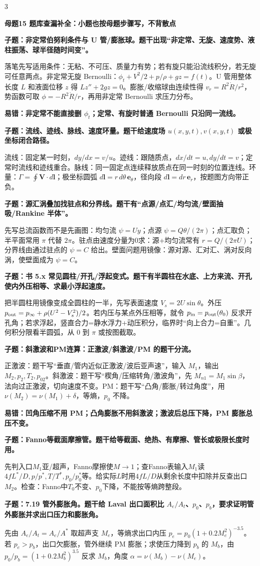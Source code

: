 \documentclass[a4paper]{article}
\newcommand{\mt}[1]{\vspace{0.22pt}\colorbox{M}{\parbox{\dimexpr\linewidth-2\fboxsep}{\color{white}\bfseries #1}}\par}
\newcommand{\qt}[1]{\vspace{0.10pt}\colorbox{Q}{\parbox{\dimexpr\linewidth-2\fboxsep}{\color{white}\bfseries #1}}\par}
\newcommand{\ans}[1]{\colorbox{G}{\parbox{\dimexpr\linewidth-2\fboxsep}{#1}}\par}
\newcommand{\warn}[1]{\colorbox{Y}{\parbox{\dimexpr\linewidth-2\fboxsep}{\color{E}\bfseries #1}}\par}
\begin{document}
\begin{multicols}{3}
\mt{母题15 题库查漏补全：小题也按母题步骤写，不背散点}
\qt{子题：非定常伯努利条件与 U 管/膨胀球。题干出现“非定常、无旋、速度势、液柱振荡、球半径随时间变”。}
\ans{落笔先写适用条件：无粘、不可压、质量力有势；若有旋只能沿流线积分，若无旋可任意两点。非定常无旋 Bernoulli：$\phi_t+V^2/2+p/\rho+gz=f(t)$。U 管用整体长度 $L$ 和液面位移 $z$ 得 $Lz''+2gz=0$。膨胀/收缩球由连续性得 $v_r=R^2\dot R/r^2$，势函数可取 $\phi=-R^2\dot R/r$，再用非定常 Bernoulli 求压力分布。}
\warn{易错：非定常不能直接删 $\phi_t$；定常、有旋时普通 Bernoulli 只沿同一流线。}
\qt{子题：流线、迹线、脉线、速度环量。题干给速度场 $u(x,y,t),v(x,y,t)$ 或极坐标闭合路径。}
\ans{流线：固定某一时刻，$dy/dx=v/u$。迹线：跟随质点，$dx/dt=u,dy/dt=v$；定常时流线和迹线重合。脉线：同一固定点连续释放质点在同一时刻的位置连线。环量：$\Gamma=\oint\bm V\cdot d\bm l$；极坐标圆弧 $d\bm l=r\,d\theta\,\bm e_\theta$，径向段 $d\bm l=dr\,\bm e_r$，按题图方向带正负。}
\qt{子题：源汇涡叠加找驻点和分界线。题干有“点源/点汇/均匀流/壁面抽吸/Rankine 半体”。}
\ans{先写总流函数而不是先画图：均匀流 $\psi=Uy$；点源 $\psi=Q\theta/(2\pi)$；点汇取负；半平面常用 $\pi$ 代替 $2\pi$。驻点由速度分量为0求：源+均匀流常有 $r=Q/(2\pi U)$；分界线由通过驻点的 $\psi=C$ 给出。壁面问题用镜像：源对源、汇对汇、涡对反向涡，使壁面成为 $\psi=C$。}
\qt{子题：书 5.x 常见圆柱/开孔/浮起变式。题干有半圆柱在水底、上方来流、开孔使内外压相等、求最小浮起速度。}
\ans{把半圆柱用镜像变成全圆柱的一半，先写表面速度 $V_s=2U\sin\theta$。外压 $p_{\rm out}=p_\infty+\rho(U^2-V_s^2)/2$。若内压与某点外压相等，就令 $p_{\rm in}=p_{\rm out}(\theta_0)$ 反求开孔角；若求浮起，竖直合力=静水浮力+动压积分，临界时“向上合力=自重”。几何积分限看半圆弧，从 $0$ 到 $\pi$ 或按图截取。}
\qt{子题：斜激波和PM连算：正激波/斜激波/PM 的题干分流。}
\ans{正激波：题干写“垂直/管内近似正激波/波后亚声速”，输入 $M_1$，输出 $M_2,p_2,T_2,p_{02}$。斜激波：题干写“楔角/压缩转角/激波角”，先 $M_{n1}=M_1\sin\beta$，法向过正激波，切向速度不变。PM：题干写“凸角/膨胀/转过角度”，用 $\nu(M_2)=\nu(M_1)+\delta$，等熵，$p_0$ 不降。}
\warn{易错：凹角压缩不用 PM；凸角膨胀不用斜激波；激波后总压下降，PM 膨胀总压不变。}
\qt{子题：Fanno等截面摩擦管。题干给等截面、绝热、有摩擦、管长或极限长度时用。}
\ans{先判入口$M_1$亚/超声，Fanno摩擦使$M\to1$；查Fanno表输入$M_1$读$4fL^*/D,p/p^*,T/T^*,p_0/p_0^*$等。给实际$L$时用$4fL/D$从剩余长度中扣除并反查出口$M_2$。检查：Fanno中$T_0$不变、$p_0$下降，不能按等熵跨整段。}
\qt{子题：7.19 管外膨胀角。题干给 Laval 出口面积比 $A_e/A_t$、$p_0$、$p_b$，要求证明管外膨胀并求出口压力和膨胀角。}
\ans{先由 $A_e/A_t=A_e/A^*$ 取超声支 $M_e$，等熵求出口内压 $p_e=p_0(1+0.2M_e^2)^{-3.5}$。若 $p_e>p_b$，出口欠膨胀，管外继续 PM 膨胀；求使压力降到 $p_b$ 的 $M_b$，由 $p_0/p_b=(1+0.2M_b^2)^{3.5}$ 反求 $M_b$，角度 $\alpha=\nu(M_b)-\nu(M_e)$。}

\end{multicols}
\end{document}
